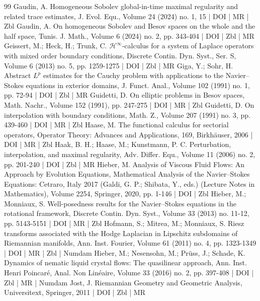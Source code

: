 \begin{thebibliography}{99}
 Gaudin, A. Homogeneous Sobolev global-in-time maximal regularity and related trace estimates, J. Evol. Equ., Volume 24 (2024) no. 1, 15 | DOI | MR | Zbl
 Gaudin, A. On homogeneous Sobolev and Besov spaces on the whole and the half space, Tunis. J. Math., Volume 6 (2024) no. 2, pp. 343-404 | DOI | Zbl | MR
 Geissert, M.; Heck, H.; Trunk, C. ${\mathcal{H}}^\infty $-calculus for a system of Laplace operators with mixed order boundary conditions, Discrete Contin. Dyn. Syst., Ser. S, Volume 6 (2013) no. 5, pp. 1259-1275 | DOI | Zbl | MR
 Giga, Y.; Sohr, H. Abstract ${L}^p$ estimates for the Cauchy problem with applications to the Navier–Stokes equations in exterior domains, J. Funct. Anal., Volume 102 (1991) no. 1, pp. 72-94 | DOI | Zbl | MR
 Guidetti, D. On elliptic problems in Besov spaces, Math. Nachr., Volume 152 (1991), pp. 247-275 | DOI | MR | Zbl
 Guidetti, D. On interpolation with boundary conditions, Math. Z., Volume 207 (1991) no. 3, pp. 439-460 | DOI | MR | Zbl
 Haase, M. The functional calculus for sectorial operators, Operator Theory: Advances and Applications, 169, Birkhäuser, 2006 | DOI | MR | Zbl
 Haak, B. H.; Haase, M.; Kunstmann, P. C. Perturbation, interpolation, and maximal regularity, Adv. Differ. Equ., Volume 11 (2006) no. 2, pp. 201-240 | DOI | Zbl | MR
 Hieber, M. Analysis of Viscous Fluid Flows: An Approach by Evolution Equations, Mathematical Analysis of the Navier–Stokes Equations: Cetraro, Italy 2017 (Galdi, G. P.; Shibata, Y., eds.) (Lecture Notes in Mathematics), Volume 2254, Springer, 2020, pp. 1-146 | DOI | Zbl
 Hieber, M.; Monniaux, S. Well-posedness results for the Navier–Stokes equations in the rotational framework, Discrete Contin. Dyn. Syst., Volume 33 (2013) no. 11-12, pp. 5143-5151 | DOI | MR | Zbl
 Hofmann, S.; Mitrea, M.; Monniaux, S. Riesz transforms associated with the Hodge Laplacian in Lipschitz subdomains of Riemannian manifolds, Ann. Inst. Fourier, Volume 61 (2011) no. 4, pp. 1323-1349 | DOI | MR | Zbl | Numdam
 Hieber, M.; Nesensohn, M.; Prüss, J.; Schade, K. Dynamics of nematic liquid crystal flows: The quasilinear approach, Ann. Inst. Henri Poincaré, Anal. Non Linéaire, Volume 33 (2016) no. 2, pp. 397-408 | DOI | Zbl | MR | Numdam
 Jost, J. Riemannian Geometry and Geometric Analysis, Universitext, Springer, 2011 | DOI | Zbl | MR

\end{thebibliography}
